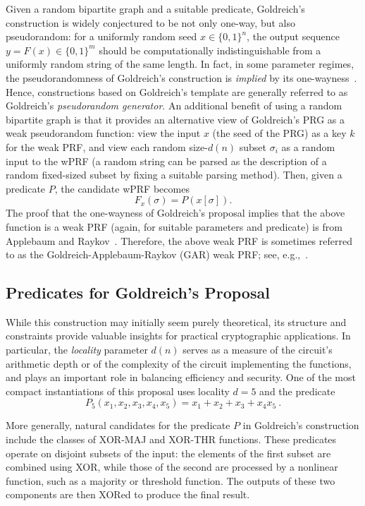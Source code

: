 \documentclass[journal=tosc,submission]{iacrtrans}
\theoremstyle{theorem}
\begin{document}
Given a random bipartite graph and a suitable predicate, Goldreich's construction is widely conjectured to be not only one-way, but also pseudorandom: for a uniformly random seed $x \in \{0,1\}^n$, the output sequence $y = F(x) \in \{0,1\}^m$ should be computationally indistinguishable from a uniformly random string of the same length. In fact, in some parameter regimes, the pseudorandomness of Goldreich's construction is \emph{implied} by its one-wayness~\cite{TCC:AppRay16b}. Hence, constructions based on Goldreich's template are generally referred to as  Goldreich's \emph{pseudorandom generator}. An additional benefit of using a random bipartite graph is that it provides an alternative view of Goldreich's PRG as a weak pseudorandom function: view the input $x$ (the seed of the PRG) as a key $k$ for the weak PRF, and view each random size-$d(n)$ subset $\sigma_i$ as a random input to the wPRF (a random string can be parsed as the description of a random fixed-sized subset by fixing a suitable parsing method). Then, given a predicate $P$, the candidate wPRF becomes
\[F_x(\sigma) = P(x[\sigma]). \]
The proof that the one-wayness of Goldreich's proposal implies that the above function is a weak PRF (again, for suitable parameters and predicate) is from Applebaum and Raykov~\cite{TCC:AppRay16b}. Therefore, the above weak PRF is sometimes referred to as the Goldreich-Applebaum-Raykov (GAR) weak PRF; see, e.g.,~\cite{EC:BCMPR24,AC:CDDKS24}.

\subsection{Predicates for Goldreich's Proposal}

While this construction may initially seem purely theoretical, its structure and constraints provide valuable insights for practical cryptographic applications. In particular, the \emph{locality} parameter $d(n)$ serves as a measure of the circuit's arithmetic depth or of the complexity of the circuit implementing the functions, and plays an important role in balancing efficiency and security. One of the most compact instantiations of this proposal uses locality $d = 5$ and the predicate
\[
P_5(x_1, x_2, x_3, x_4, x_5) = x_1 + x_2 + x_3 + x_4 x_5~.
\]

More generally, natural candidates for the predicate $P$ in Goldreich’s construction include the classes of \textsf{XOR-MAJ} and \textsf{XOR-THR} functions. These predicates operate on disjoint subsets of the input: the elements of the first subset are combined using XOR, while those of the second are processed by a nonlinear function, such as a majority or threshold function. The outputs of these two components are then XORed to produce the final result.
\end{document}
